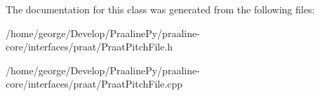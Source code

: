 The documentation for this class was generated from the following files\+:\begin{DoxyCompactItemize}
\item 
/home/george/\+Develop/\+Praaline\+Py/praaline-\/core/interfaces/praat/Praat\+Pitch\+File.\+h\item 
/home/george/\+Develop/\+Praaline\+Py/praaline-\/core/interfaces/praat/Praat\+Pitch\+File.\+cpp\end{DoxyCompactItemize}
